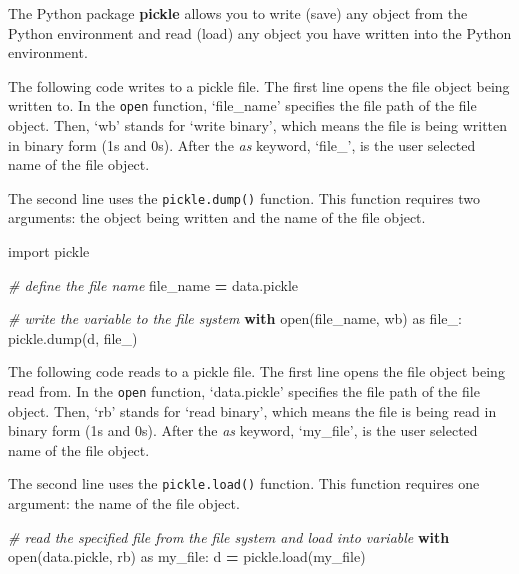\documentclass[
]{book}
\newenvironment{Shaded}{\begin{snugshade}}{\end{snugshade}}
\newcommand{\BuiltInTok}[1]{#1}
\newcommand{\CommentTok}[1]{\textcolor[rgb]{0.56,0.35,0.01}{\textit{#1}}}
\newcommand{\ControlFlowTok}[1]{\textcolor[rgb]{0.13,0.29,0.53}{\textbf{#1}}}
\newcommand{\ImportTok}[1]{#1}
\newcommand{\NormalTok}[1]{#1}
\newcommand{\OperatorTok}[1]{\textcolor[rgb]{0.81,0.36,0.00}{\textbf{#1}}}
\newcommand{\StringTok}[1]{\textcolor[rgb]{0.31,0.60,0.02}{#1}}
\begin{document}
The Python package \textbf{pickle} allows you to write (save) any object from the Python environment and read (load) any object you have written into the Python environment.

The following code writes to a pickle file. The first line opens the file object being written to. In the \texttt{open} function, `file\_name' specifies the file path of the file object. Then, `wb' stands for `write binary', which means the file is being written in binary form (1s and 0s). After the \emph{as} keyword, `file\_', is the user selected name of the file object.

The second line uses the \texttt{pickle.dump()} function. This function requires two arguments: the object being written and the name of the file object.

\begin{Shaded}
\begin{Highlighting}[]
\ImportTok{import}\NormalTok{ pickle}

\CommentTok{\# define the file name}
\NormalTok{file\_name }\OperatorTok{=} \StringTok{\textquotesingle{}data.pickle\textquotesingle{}}

\CommentTok{\# write the variable to the file system}
\ControlFlowTok{with} \BuiltInTok{open}\NormalTok{(file\_name, }\StringTok{\textquotesingle{}wb\textquotesingle{}}\NormalTok{) }\ImportTok{as}\NormalTok{ file\_:}
\NormalTok{    pickle.dump(d, file\_)}
\end{Highlighting}
\end{Shaded}

The following code reads to a pickle file. The first line opens the file object being read from. In the \texttt{open} function, `data.pickle' specifies the file path of the file object. Then, `rb' stands for `read binary', which means the file is being read in binary form (1s and 0s). After the \emph{as} keyword, `my\_file', is the user selected name of the file object.

The second line uses the \texttt{pickle.load()} function. This function requires one argument: the name of the file object.

\begin{Shaded}
\begin{Highlighting}[]

\CommentTok{\# read the specified file from the file system and load into variable}
\ControlFlowTok{with} \BuiltInTok{open}\NormalTok{(}\StringTok{\textquotesingle{}data.pickle\textquotesingle{}}\NormalTok{, }\StringTok{\textquotesingle{}rb\textquotesingle{}}\NormalTok{) }\ImportTok{as}\NormalTok{ my\_file:}
\NormalTok{    d }\OperatorTok{=}\NormalTok{ pickle.load(my\_file)}
\end{Highlighting}
\end{Shaded}
\end{document}
